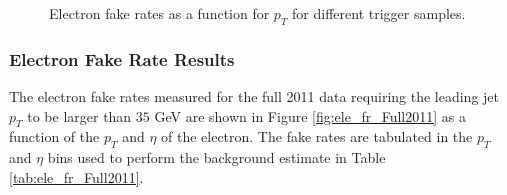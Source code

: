 \begin{figure}[!htbp]
\begin{center}
\caption{Electron fake rates as a function for $p_{T}$ for different trigger samples.}
\label{fig:ele_fr_triggerBiasCheck}
\end{center}
\end{figure}



\subsubsection{Electron Fake Rate Results}

The electron fake rates measured for the full 2011 data requiring the leading jet $p_{T}$ to be 
larger than $35$ GeV are shown in Figure \ref{fig:ele_fr_Full2011} as a function of the $p_{T}$ 
and $\eta$ of the electron. The fake rates are tabulated in the 
$p_{T}$ and $\eta$ bins used to perform the background estimate in Table \ref{tab:ele_fr_Full2011}.


